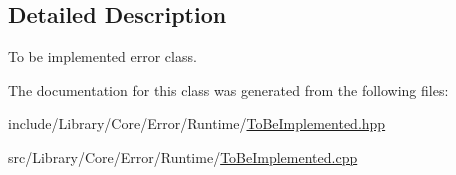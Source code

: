 \subsection{Detailed Description}
To be implemented error class. 

The documentation for this class was generated from the following files\+:\begin{DoxyCompactItemize}
\item 
include/\+Library/\+Core/\+Error/\+Runtime/\hyperlink{_to_be_implemented_8hpp}{To\+Be\+Implemented.\+hpp}\item 
src/\+Library/\+Core/\+Error/\+Runtime/\hyperlink{_to_be_implemented_8cpp}{To\+Be\+Implemented.\+cpp}\end{DoxyCompactItemize}
